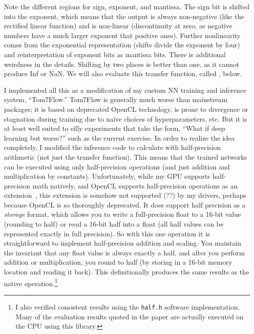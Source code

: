 \documentclass[twocolumn]{article}
\begin{document}
Note the different regions for sign, exponent, and mantissa.
The sign bit is shifted into the exponent, which means that the output
is always non-negative (like the rectified linear function) and is
non-linear (discontinuity at zero, as negative numbers have a much
larger exponent that positive ones). Further nonlinearity comes from
the exponential representation (shifts divide the exponent by four)
and reinterpretation of exponent bits as mantissa bits. There is
additional weirdness in the details. Shifting by two places is better
than one, as it cannot produce Inf or NaN.
We will also evaluate this transfer function, called \downshifttwo,
below.

I implemented all this as a modification of my custom NN training and
inference system, ``Tom7Flow.'' Tom7Flow is generally much worse than
mainstream packages; it is based on deprecated OpenCL technology, is
prone to divergence or stagnation during training due to na\"ive
choices of hyperparameters, etc. But it is at least well suited to
silly experiments that take the form, ``What if deep learning but
worse?'' such as the current exercise. In order to realize the idea
completely, I modified the inference code to calculate with
half-precision arithmetic (not just the transfer function). This means
that the trained networks can be executed using only half-precision
operations (and just addition and multiplication by constants).
Unfortunately, while my GPU supports half-precision math natively, and
OpenCL supports half-precision operations as an
extension~\cite{openclextensions}, this extension is somehow not
supported (??) by my drivers, perhaps because OpenCL is so thoroughly
deprecated. It does support half precision as a {\em storage} format,
which allows you to write a full-precision float to a 16-bit value
(rounding to half) or read a 16-bit half into a float (all half values
can be represented exactly in full precision). So with this one
operation it is straightforward to implement half-precision addition
and scaling. You maintain the invariant that any float value is always
exactly a half, and after you perform addition or multiplication, you
round to half (by storing in a 16-bit memory location and reading it
back). This definitionally produces the same results as the native
operation.\footnote{I also verified consistent results using the
  \verb+half.h+ software implementation. Many of the evaluation
  results quoted in the paper are actually executed on the CPU
  using this library.}
\end{document}
